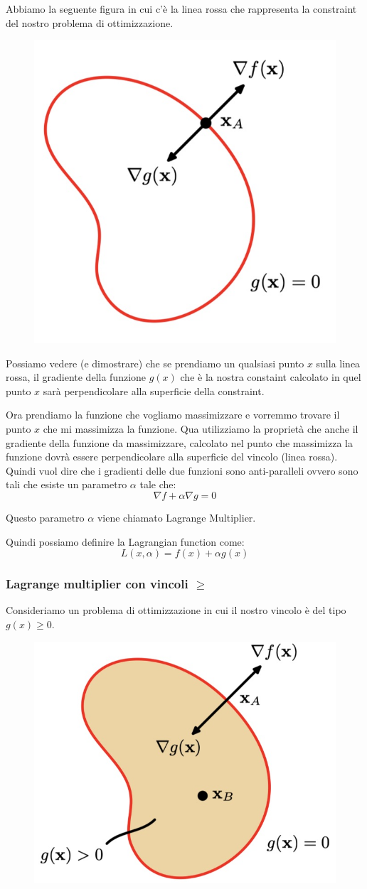 \documentclass[14pt]{extreport}
\begin{document}
Abbiamo la seguente figura in cui c'è la linea rossa che rappresenta la constraint del nostro problema di ottimizzazione.

\begin{figure}[H]
\centering
\includegraphics[width=0.5\linewidth]{348.jpeg}
\end{figure}


Possiamo vedere (e dimostrare) che se prendiamo un qualsiasi punto $x$ sulla linea rossa, il gradiente della funzione $g(x)$ che è la nostra constaint
calcolato in quel punto $x$ sarà perpendicolare alla superficie della constraint.

Ora prendiamo la funzione che vogliamo massimizzare e vorremmo trovare il punto $x$ che mi massimizza la funzione. Qua utilizziamo la proprietà che
anche il gradiente della funzione da massimizzare, calcolato nel punto che massimizza la funzione dovrà essere perpendicolare alla superficie del
vincolo (linea rossa). Quindi vuol dire che i gradienti delle due funzioni sono anti-paralleli ovvero sono tali che esiste un parametro $\alpha$ tale
che: $$\nabla f + \alpha \nabla g = 0$$

Questo parametro $\alpha$ viene chiamato Lagrange Multiplier.

Quindi possiamo definire la Lagrangian function come: $$L(x, \alpha) = f(x) + \alpha g(x)$$

\subsubsection{Lagrange multiplier con vincoli $\geq$}

Consideriamo un problema di ottimizzazione in cui il nostro vincolo è del tipo $g(x) \geq 0$.

\begin{figure}[H]
\centering
\includegraphics[width=0.5\linewidth]{349.jpeg}
\end{figure}
\end{document}
